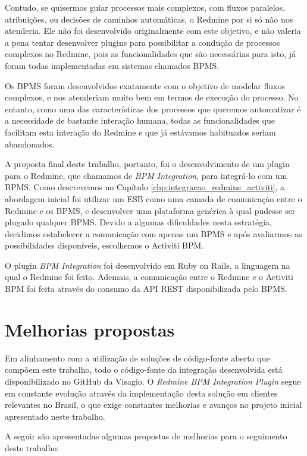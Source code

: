 Contudo, se quisermos guiar processos mais complexos, com fluxos paralelos, atribuições, ou decisões de caminhos automáticas, o Redmine por si só não nos atenderia. Ele não foi desenvolvido originalmente com este objetivo, e não valeria a pena tentar desenvolver plugins para possibilitar a condução de processos complexos no Redmine, pois as funcionalidades que são necessárias para isto, já foram todas implementadas em sistemas chamados BPMS.

Os BPMS foram desenvolvidos exatamente com o objetivo de modelar fluxos complexos, e nos atenderiam muito bem em termos de execução do processo. No entanto, como uma das características dos processos que queremos automatizar é a necessidade de bastante interação humana, todas as funcionalidades que facilitam esta interação do Redmine e que já estávamos habituados seriam abandonados. 

A proposta final deste trabalho, portanto, foi o desenvolvimento de um plugin para o Redmine, que chamamos de \textit{BPM Integration}, para integrá-lo com um BPMS. Como descrevemos no Capítulo \ref{chp:integracao_redmine_activiti}, a abordagem inicial foi utilizar um ESB\cite{esb} como uma camada de comunicação entre o Redmine e os BPMS, e desenvolver uma plataforma genérica à qual pudesse ser plugado qualquer BPMS. Devido a algumas dificuldades nesta estratégia, decidimos estabelecer a comunicação com apenas um BPMS e após avaliarmos as possibilidades disponíveis, escolhemos o Activiti BPM\cite{bpm_activiti}.

O plugin \textit{BPM Integration} foi desenvolvido em Ruby on Rails, a linguagem na qual o Redmine foi feito. Ademais, a comunicação entre o Redmine e o Activiti BPM foi feita através do consumo da API REST disponibilizada pelo BPMS.


\section{Melhorias propostas}\label{sec:conclusao-melhorias}

Em alinhamento com a utilização de soluções de código-fonte aberto que compõem este trabalho, todo o código-fonte da integração desenvolvida está disponibilizado no GitHub da Visagio\cite{github_visagio}. O \textit{Redmine BPM Integration Plugin} segue em constante evolução através da implementação desta solução em clientes relevantes no Brasil, o que exige constantes melhorias e avanços no projeto inicial apresentado neste trabalho.

A seguir são apresentadas algumas propostas de melhorias para o seguimento deste trabalho:

